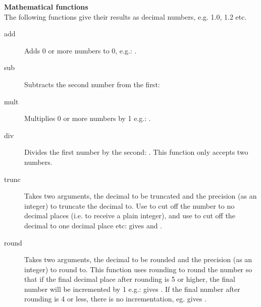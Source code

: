 \textbf{Mathematical functions}\\
The following functions give their results as decimal numbers, e.g. 1.0, 1.2 etc. 
\begin{description}
\item [add]{Adds 0 or more numbers to 0, e.g.: .}
\item [sub]{Subtracts the second number from the first: }
\item [mult]{Multiplies 0 or more numbers by 1 e.g.: .}
\item [div]{Divides the first number by the second: . This function only accepts two numbers.}
\item [trunc]{Takes two arguments, the decimal to be truncated and the precision (as an integer) to truncate the decimal to. Use  to cut off the number to no decimal places (i.e. to receive a plain integer), and use  to cut off the decimal to one decimal place etc:  gives  and .}
\item [round]{Takes two arguments, the decimal to be rounded and the precision (as an integer) to round to. This function uses  rounding to round the number so that if the final decimal place after rounding is 5 or higher, the final number will be incremented by 1 e.g.:  gives . If the final number after rounding is 4 or less, there is no incrementation, eg.  gives . }
\end{description}

